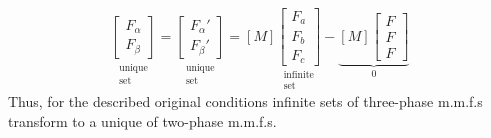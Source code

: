 \documentclass[a4paper,numbers=noenddot,12pt]{scrbook}
\begin{document}
\begin{equation}
    \underset{\substack{\text{unique} \\ \text{set}}}
    {\begin{bmatrix}
        F_{\alpha} \\ F_{\beta}
    \end{bmatrix}}
    =
    \underset{\substack{\text{unique} \\ \text{set}}}
    {\begin{bmatrix}
        F_{\alpha}' \\ F_{\beta}'
    \end{bmatrix}}
    = [M]
    \underset{\substack{\text{infinite} \\ \text{set}}}
    {\begin{bmatrix}
        F_a \\ F_b \\ F_c
    \end{bmatrix}}
    -
    \underbrace
    {[M]
        \begin{bmatrix}
            F \\ F \\ F
        \end{bmatrix}}_{0}
        \label{eq:Eq7.9}
    \end{equation}
    Thus, for the described original conditions infinite sets of three-phase m.m.f.s transform to a unique of two-phase m.m.f.s.
\end{document}
